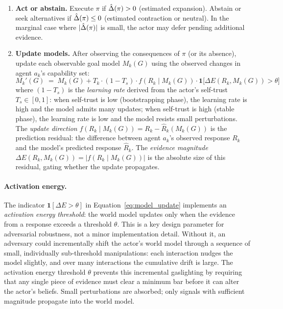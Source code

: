\begin{enumerate}
\item \textbf{Act or abstain.} Execute $\pi$ if $\hat{\Delta}(\pi) > 0$ (estimated expansion). Abstain or seek alternatives if $\hat{\Delta}(\pi) \leq 0$ (estimated contraction or neutral). In the marginal case where $|\hat{\Delta}(\pi)|$ is small, the actor may defer pending additional evidence.

\item \textbf{Update models.} After observing the consequences of $\pi$ (or its absence), update each observable goal model $M_k(G)$ using the observed changes in agent $a_k$'s capability set:
\begin{equation}
\label{eq:model_update}
M_k'(G) \;=\; M_k(G) + T_k \cdot (1 - T_s) \cdot f(R_k \mid M_k(G)) \cdot \mathbf{1}\bigl[\Delta E(R_k, M_k(G)) > \theta\bigr]
\end{equation}
where $(1 - T_s)$ is the \emph{learning rate} derived from the actor's self-trust $T_s \in [0,1]$: when self-trust is low (bootstrapping phase), the learning rate is high and the model admits many updates; when self-trust is high (stable phase), the learning rate is low and the model resists small perturbations. The \emph{update direction} $f(R_k \mid M_k(G)) = R_k - \hat{R}_k(M_k(G))$ is the prediction residual: the difference between agent $a_k$'s observed response $R_k$ and the model's predicted response $\hat{R}_k$. The \emph{evidence magnitude} $\Delta E(R_k, M_k(G)) = |f(R_k \mid M_k(G))|$ is the absolute size of this residual, gating whether the update propagates.
\end{enumerate}

\paragraph{Activation energy.} The indicator $\mathbf{1}[\Delta E > \theta]$ in
Equation~\eqref{eq:model_update} implements an \emph{activation energy
threshold}: the world model updates only when the evidence from a response
exceeds a threshold $\theta$. This is a key design parameter for adversarial
robustness, not a minor implementation detail. Without it, an adversary could
incrementally shift the actor's world model through a sequence of small,
individually sub-threshold manipulations: each interaction nudges the model
slightly, and over many interactions the cumulative drift is large. The
activation energy threshold $\theta$ prevents this incremental gaslighting by
requiring that any single piece of evidence must clear a minimum bar before it
can alter the actor's beliefs. Small perturbations are absorbed; only signals
with sufficient magnitude propagate into the world model.

